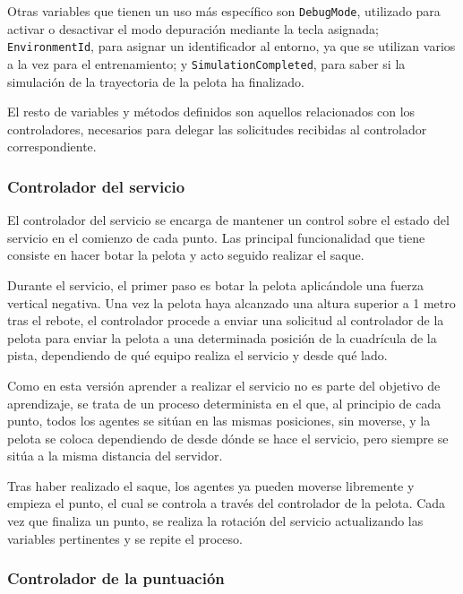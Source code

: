 Otras variables que tienen un uso más específico son \texttt{DebugMode}, utilizado para activar o desactivar el modo depuración mediante la tecla asignada; \texttt{EnvironmentId}, para asignar un identificador al entorno, ya que se utilizan varios a la vez para el entrenamiento; y \texttt{SimulationCompleted}, para saber si la simulación de la trayectoria de la pelota ha finalizado. 

El resto de variables y métodos definidos son aquellos relacionados con los controladores, necesarios para delegar las solicitudes recibidas al controlador correspondiente.

\newpage

\subsubsection{Controlador del servicio}

El controlador del servicio se encarga de mantener un control sobre el estado del servicio en el comienzo de cada punto. Las principal funcionalidad que tiene consiste en hacer botar la pelota y acto seguido realizar el saque.

Durante el servicio, el primer paso es botar la pelota aplicándole una fuerza vertical negativa. Una vez la pelota haya alcanzado una altura superior a 1 metro tras el rebote, el controlador procede a enviar una solicitud al controlador de la pelota para enviar la pelota a una determinada posición de la cuadrícula de la pista, dependiendo de qué equipo realiza el servicio y desde qué lado.

Como en esta versión aprender a realizar el servicio no es parte del objetivo de aprendizaje, se trata de un proceso determinista en el que, al principio de cada punto, todos los agentes se sitúan en las mismas posiciones, sin moverse, y la pelota se coloca dependiendo de desde dónde se hace el servicio, pero siempre se sitúa a la misma distancia del servidor.

Tras haber realizado el saque, los agentes ya pueden moverse libremente y empieza el punto, el cual se controla a través del controlador de la pelota. Cada vez que finaliza un punto, se realiza la rotación del servicio actualizando las variables pertinentes y se repite el proceso.

\subsubsection{Controlador de la puntuación}

